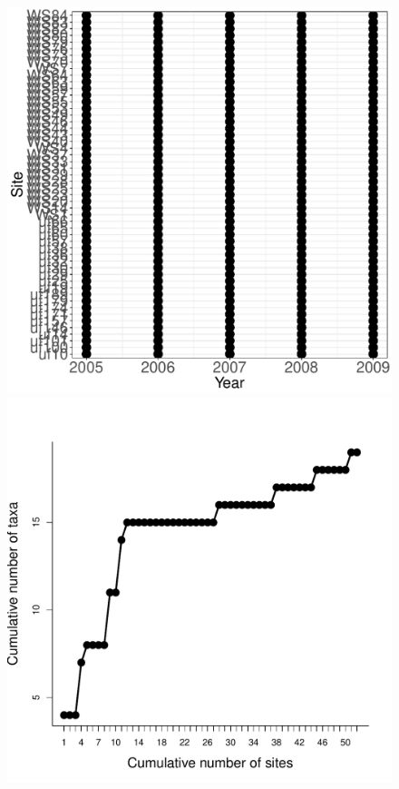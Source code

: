 \documentclass[11pt, oneside]{article}
\begin{document}
\begin{figure}[h!]
\includegraphics[scale = 0.4]{bes-birds-nilon_spatiotemporal_sampling_effort.pdf}
\includegraphics[scale = 0.4]{bes-birds-nilon_species_accumulation_space.pdf}

\end{figure}
\end{document}
